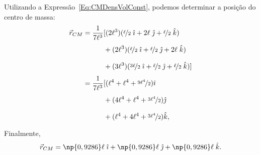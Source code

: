 Utilizando a Expressão~\eqref{Eq:CMDensVolConst}, podemos determinar a posição do centro de massa:
\begin{align}
    \vec{r}_{CM} &= \frac{1}{7\ell^3} [(2\ell^3)(\nicefrac{\ell}{2}\;\versi + 2\ell\;\versj + \nicefrac{\ell}{2}\;\versk) \\
    &\phantom{=\frac{1}{7\ell^3} [} + (2\ell^3)(\nicefrac{\ell}{2}\;\versi + \nicefrac{\ell}{2}\;\versj + 2\ell\;\versk) \\
    &\phantom{=\frac{1}{7\ell^3} [} + (3\ell^3)(\nicefrac{3\ell}{2}\;\versi + \nicefrac{\ell}{2}\;\versj + \nicefrac{\ell}{2}\;\versk)] \\
    &= \frac{1}{7\ell^3} [(\ell^4 + \ell^4 + \nicefrac{9\ell^4}{2})\versi \\
    &\phantom{=\frac{1}{7\ell^3} [}+ (4\ell^4 + \ell^4 + \nicefrac{3\ell^4}{2})\versj \\
    &\phantom{=\frac{1}{7\ell^3} [}+ (\ell^4 + 4\ell^4 + \nicefrac{3\ell^4}{2})\versk,
\end{align}
%
Finalmente,
\begin{equation}
	\vec{r}_{CM} = \np{0,9286} \ell\; \versi + \np{0,9286} \ell \; \versj + \np{0,9286} \ell \; \versk.
\end{equation}

